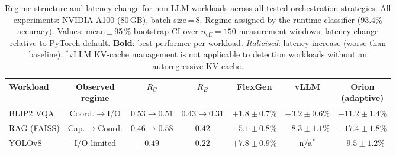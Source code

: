 \begin{table}[t]
\centering
\caption{Regime structure and latency change for non-LLM workloads across all
         tested orchestration strategies.
         All experiments: NVIDIA A100 (80\,GB), batch size\,=\,8.
         Regime assigned by the runtime classifier (93.4\% accuracy).
         Values: mean\,$\pm$\,95\,\% bootstrap CI over
         $n_{\mathrm{eff}}\!=\!150$ measurement windows;
         latency change relative to PyTorch default.
         \textbf{Bold}: best performer per workload.
         \emph{Italicised}: latency increase (worse than baseline).
         $^{*}$vLLM KV-cache management is not applicable to detection
         workloads without an autoregressive KV cache.}
\label{tab:generality}
\renewcommand{\arraystretch}{1.2}
\footnotesize
\begin{tabular}{lcccccc}
\toprule
\textbf{Workload} &
  \makecell{\textbf{Observed}\\\textbf{regime}} &
  $R_C$ & $R_B$ &
  \textbf{FlexGen} &
  \textbf{vLLM} &
  \makecell{\textbf{Orion}\\\textbf{(adaptive)}} \\
\midrule
BLIP2 VQA
  & Coord.$\to$I/O
  & $0.53\!\to\!0.51$ & $0.43\!\to\!0.31$
  & $\mathit{+1.8 \pm 0.7\%}$
  & $-3.2 \pm 0.6\%$
  & $\mathbf{-11.2 \pm 1.4\%}$ \\
RAG (FAISS)
  & Cap.$\to$Coord.
  & $0.46\!\to\!0.58$ & $0.42$
  & $-5.1 \pm 0.8\%$
  & $-8.3 \pm 1.1\%$
  & $\mathbf{-17.4 \pm 1.8\%}$ \\
YOLOv8
  & I/O-limited
  & $0.49$ & $0.22$
  & $\mathit{+7.8 \pm 0.9\%}$
  & n/a$^{*}$
  & $\mathbf{-9.5 \pm 1.2\%}$ \\
\bottomrule
\end{tabular}
\end{table}

